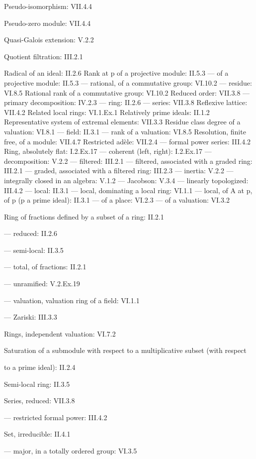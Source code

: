 Pseudo-isomorphism: VII.4.4

Pseudo-zero module: VII.4.4

Quasi-Galois extension: V.2.2

Quotient filtration: III.2.1

Radical of an ideal: II.2.6 Rank at p of a projective module: II.5.3 --- of a projective module: II.5.3 --- rational, of a commutative group: VI.10.2 --- residue: VI.8.5 Rational rank of a commutative group: VI.10.2 Reduced order: VII.3.8 --- primary decomposition: IV.2.3 --- ring: II.2.6 --- series: VII.3.8 Reflexive lattice: VII.4.2 Related local rings: VI.1.Ex.1 Relatively prime ideals: II.1.2 Representative system of extremal elements: VII.3.3 Residue class degree of a valuation: VI.8.1 --- field: II.3.1 --- rank of a valuation: VI.8.5 Resolution, finite free, of a module: VII.4.7 Restricted adèle: VII.2.4 --- formal power series: III.4.2 Ring, absolutely flat: I.2.Ex.17 --- coherent (left, right): I.2.Ex.17 --- decomposition: V.2.2 --- filtered: III.2.1 --- filtered, associated with a graded ring: III.2.1 --- graded, associated with a filtered ring: III.2.3 --- inertia: V.2.2 --- integrally closed in an algebra: V.1.2 --- Jacobson: V.3.4 --- linearly topologized: III.4.2 --- local: II.3.1 --- local, dominating a local ring: VI.1.1 --- local, of A at p, of p (p a prime ideal): II.3.1 --- of a place: VI.2.3 --- of a valuation: VI.3.2

Ring of fractions defined by a subset of a ring: II.2.1

--- reduced: II.2.6

--- semi-local: II.3.5

--- total, of fractions: II.2.1

--- unramified: V.2.Ex.19

--- valuation, valuation ring of a field: VI.1.1

--- Zariski: III.3.3

Rings, independent valuation: VI.7.2

Saturation of a submodule with respect to a multiplicative subset (with respect

to a prime ideal): II.2.4

Semi-local ring: II.3.5

Series, reduced: VII.3.8

--- restricted formal power: III.4.2

Set, irreducible: II.4.1

--- major, in a totally ordered group: VI.3.5

